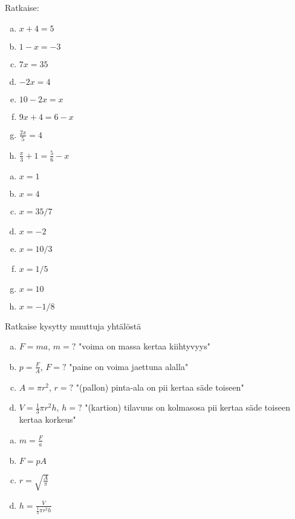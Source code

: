 \begin{tehtava}
%
Ratkaise:
\begin{enumerate}[a)]
\item $x + 4 = 5$
\item $1 - x = -3$
\item $7x = 35$
\item $-2x = 4$
\item $10 - 2x = x$
\item $9x + 4 = 6 - x$
\item $\frac{2x}{5} = 4$
\item $\frac{x}{3} + 1 = \frac{5}{6} - x$
\end{enumerate}
\begin{vastaus}
\begin{enumerate}[a)]
\item $x=1$
\item $x=4$
\item $x=35/7$
\item $x=-2$
\item $x=10/3$
\item $x=1/5$
\item $x=10$
\item $x=-1/8$
\end{enumerate}
\end{vastaus}
\end{tehtava}

\begin{tehtava}
Ratkaise kysytty muuttuja yhtälöstä
\begin{enumerate}[a)]
\item $F=ma$, $m=?$ "voima on massa kertaa kiihtyvyys"
\item $p=\frac{F}{A}$, $F=?$ "paine on voima jaettuna alalla"
\item $A=\pi r^2$, $r=?$ "(pallon) pinta-ala on pii kertaa säde toiseen"
\item $V=\frac{1}{3} \pi r^2 h$, $h=?$ "(kartion) tilavuus on kolmasosa pii kertaa säde toiseen kertaa korkeus"
\end{enumerate}
\begin{vastaus}
\begin{enumerate}[a)]
\item $m=\frac{F}{a}$
\item $F=p A$
\item $r=\sqrt{\frac{A}{\pi}}$
\item $h=\frac{V}{ \frac{1}{3} \pi r^2 h}$
\end{enumerate}
\end{vastaus}
\end{tehtava}

